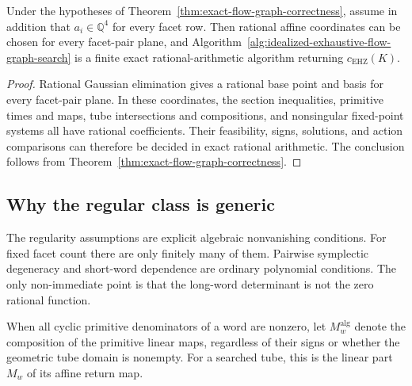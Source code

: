 \begin{corollary}
\label{cor:rational-flow-graph-correctness}
Under the hypotheses of
Theorem~\ref{thm:exact-flow-graph-correctness}, assume in addition that
\(a_i\in\mathbb Q^4\) for every facet row.  Then rational affine coordinates
can be chosen for every facet-pair plane, and
Algorithm~\ref{alg:idealized-exhaustive-flow-graph-search} is a finite exact
rational-arithmetic algorithm returning \(c_{\mathrm{EHZ}}(K)\).
\end{corollary}

\begin{proof}
Rational Gaussian elimination gives a rational base point and basis for every
facet-pair plane.  In these coordinates, the section inequalities, primitive
times and maps, tube intersections and compositions, and nonsingular
fixed-point systems all have rational coefficients.  Their feasibility, signs,
solutions, and action comparisons can therefore be decided in exact rational
arithmetic.  The conclusion follows from
Theorem~\ref{thm:exact-flow-graph-correctness}.
\end{proof}

\subsection{Why the regular class is generic}
\label{subsec:flow-graph-algorithm-ch2021-genericity}

The regularity assumptions are explicit algebraic nonvanishing conditions.
For fixed facet count there are only finitely many of them.  Pairwise
symplectic degeneracy and short-word dependence are ordinary polynomial
conditions.  The only non-immediate point is that the long-word determinant is
not the zero rational function.

When all cyclic primitive denominators of a word are nonzero, let
\(M_w^{\mathrm{alg}}\) denote the composition of the primitive linear maps,
regardless of their signs or whether the geometric tube domain is nonempty.
For a searched tube, this is the linear part \(M_w\) of its affine return map.

